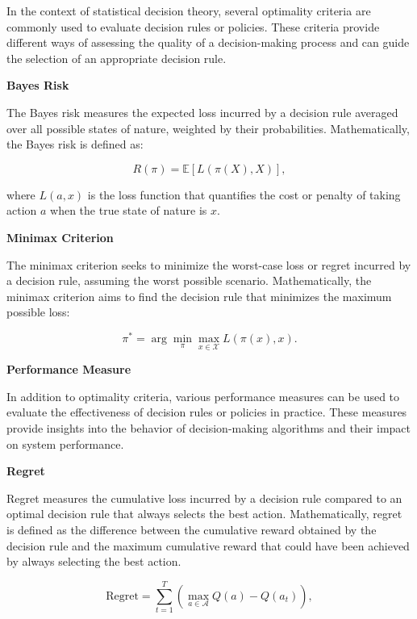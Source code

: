 \documentclass[12pt]{book} %
\begin{document}
In the context of statistical decision theory, several optimality criteria are commonly used to evaluate decision rules or policies. These criteria provide different ways of assessing the quality of a decision-making process and can guide the selection of an appropriate decision rule.

\textbf{Bayes Risk}

The Bayes risk measures the expected loss incurred by a decision rule averaged over all possible states of nature, weighted by their probabilities. Mathematically, the Bayes risk is defined as:

\begin{equation*}
    R(\pi) = \mathbb{E}[L(\pi(X), X)],
\end{equation*}

where $L(a, x)$ is the loss function that quantifies the cost or penalty of taking action $a$ when the true state of nature is $x$.

\textbf{Minimax Criterion}

The minimax criterion seeks to minimize the worst-case loss or regret incurred by a decision rule, assuming the worst possible scenario. Mathematically, the minimax criterion aims to find the decision rule that minimizes the maximum possible loss:

\begin{equation*}
    \pi^* = \arg\min_{\pi} \max_{x \in \mathcal{X}} L(\pi(x), x).
\end{equation*}

\textbf{Performance Measure}

In addition to optimality criteria, various performance measures can be used to evaluate the effectiveness of decision rules or policies in practice. These measures provide insights into the behavior of decision-making algorithms and their impact on system performance.

\textbf{Regret}

Regret measures the cumulative loss incurred by a decision rule compared to an optimal decision rule that always selects the best action. Mathematically, regret is defined as the difference between the cumulative reward obtained by the decision rule and the maximum cumulative reward that could have been achieved by always selecting the best action.

\begin{equation*}
    \text{Regret} = \sum_{t=1}^{T} \left( \max_{a \in \mathcal{A}} Q(a) - Q(a_t) \right),
\end{equation*}
\end{document}
